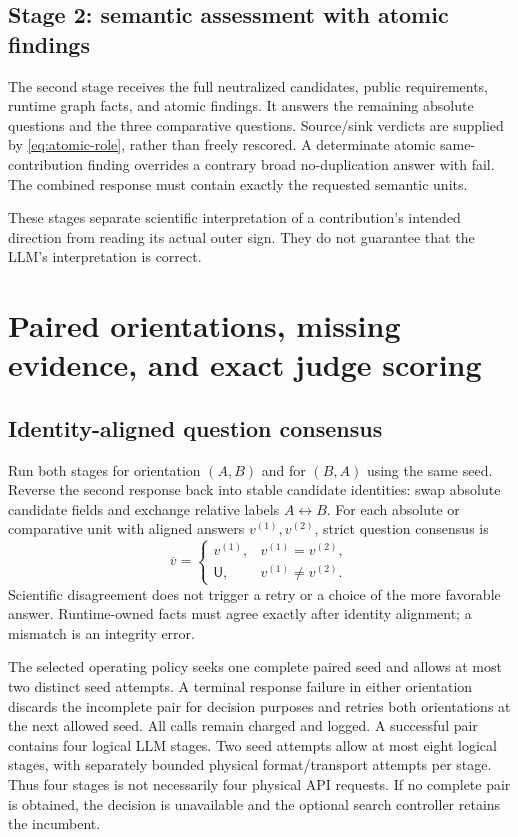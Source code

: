 \documentclass[11pt]{article}
\newcommand{\UNK}{\mathsf{U}}
\begin{document}
\subsection{Stage 2: semantic assessment with atomic findings}
The second stage receives the full neutralized candidates, public requirements,
runtime graph facts, and atomic findings. It answers the remaining absolute
questions and the three comparative questions. Source/sink verdicts are supplied
by \eqref{eq:atomic-role}, rather than freely rescored. A determinate atomic
same-contribution finding overrides a contrary broad no-duplication answer with
fail. The combined response must contain exactly the requested semantic units.

These stages separate scientific interpretation of a contribution's intended
direction from reading its actual outer sign. They do not guarantee that the
LLM's interpretation is correct.

\section{Paired orientations, missing evidence, and exact judge scoring}
\label{sec:judge-scoring}

\subsection{Identity-aligned question consensus}
Run both stages for orientation $(A,B)$ and for $(B,A)$ using the same seed.
Reverse the second response back into stable candidate identities: swap absolute
candidate fields and exchange relative labels $A\leftrightarrow B$.
For each absolute or comparative unit with aligned answers $v^{(1)},v^{(2)}$,
strict question consensus is
\begin{equation}
 \overline v=\begin{cases}
 v^{(1)},&v^{(1)}=v^{(2)},\\
 \UNK,&v^{(1)}\ne v^{(2)}.
 \end{cases}
 \label{eq:consensus}
\end{equation}
Scientific disagreement does not trigger a retry or a choice of the more favorable
answer. Runtime-owned facts must agree exactly after identity alignment; a
mismatch is an integrity error.

The selected operating policy seeks one complete paired seed and allows at most
two distinct seed attempts. A terminal response failure in either orientation
discards the incomplete pair for decision purposes and retries both orientations
at the next allowed seed. All calls remain charged and logged. A successful pair
contains four logical LLM stages. Two seed attempts allow at most eight logical
stages, with separately bounded physical format/transport attempts per stage.
Thus four stages is not necessarily four physical API requests. If no complete
pair is obtained, the decision is unavailable and the optional search controller
retains the incumbent.
\end{document}
